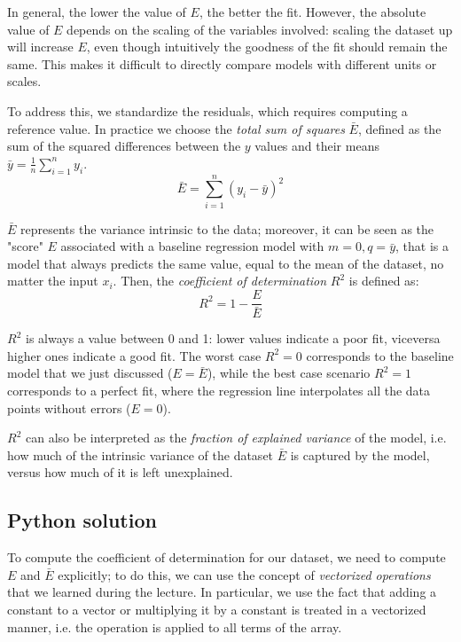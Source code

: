 \documentclass{article}
\begin{document}
In general, the lower the value of $E$, the better the fit. However, the absolute value of $E$ depends on the scaling of the variables involved: scaling the dataset up will increase $E$, even though intuitively the goodness of the fit should remain the same. This makes it difficult to directly compare models with different units or scales.  

To address this, we standardize the residuals, which requires computing a reference value. In practice we choose the \emph{total sum of squares} $\bar{E}$, defined as the sum of the squared differences between the $y$ values and their means $\bar{y} = \frac{1}{n}\sum_{i=1}^{n} y_i$.
\begin{equation*}
    \bar{E}=\sum_{i=1}^{n} (y_i -\bar{y})^2
\end{equation*}

$\bar{E}$ represents the variance intrinsic to the data; moreover, it can be seen as the "score" $E$ associated with a baseline regression model with $m=0, q=\bar{y}$, that is a model that always predicts the same value, equal to the mean of the dataset, no matter the input $x_i$. 
Then, the \emph{coefficient of determination} $R^2$ is defined as:
\begin{equation*}
    R^2 = 1 - \frac{E}{\bar{E}}
\end{equation*}

$R^2$ is always a value between 0 and 1: lower values indicate a poor fit, viceversa higher  ones indicate a good fit. The worst case $R^2 =0 $ corresponds to the baseline model that we just discussed ($E = \bar{E}$), while the best case scenario $R^2 =1 $ corresponds to a perfect fit, where the regression line interpolates all the data points without errors ($E = 0$).

$R^2$ can also be interpreted as the \emph{fraction of explained variance} of the model, i.e. how much of the intrinsic variance of the dataset $\bar{E}$ is captured by the model, versus how much of it is left unexplained.

\subsection{Python solution}
To compute the coefficient of determination for our dataset, we need to compute $E$ and $\bar{E}$ explicitly; to do this, we can use the concept of \emph{vectorized operations} that we learned during the lecture. In particular, we use the fact that adding a constant to a vector or multiplying it by a constant is treated in a vectorized manner, i.e.  the operation is applied to all terms of the array.
\end{document}
